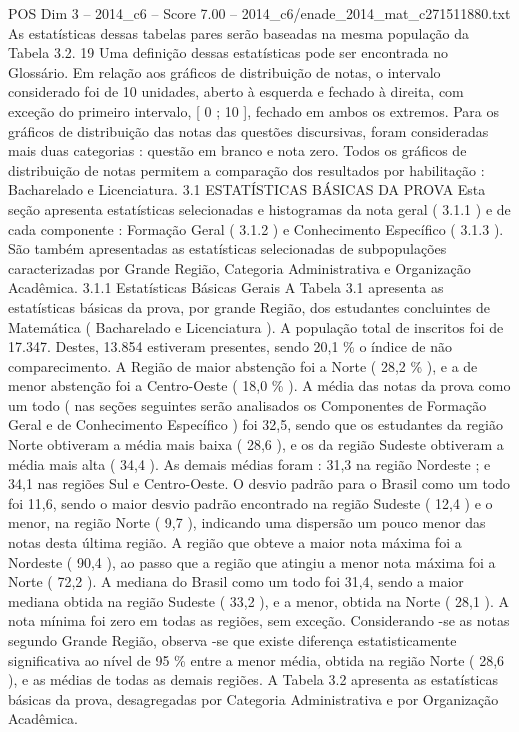 \begin{textsample}{POS Dim 3 – 2014\_c6 – Score 7.00 – 2014\_c6/enade\_2014\_mat\_c271511880.txt}
As estatísticas dessas tabelas pares serão baseadas na mesma população da Tabela 3.2. 19 Uma definição dessas estatísticas pode ser encontrada no Glossário.
Em relação aos gráficos de distribuição de notas, o intervalo considerado foi de 10 unidades, aberto à esquerda e fechado à direita, com exceção do primeiro intervalo, [ 0 ; 10 ], fechado em ambos os extremos.
Para os gráficos de distribuição das notas das questões discursivas, foram consideradas mais duas categorias : questão em branco e nota zero.
Todos os gráficos de distribuição de notas permitem a comparação dos resultados por habilitação : Bacharelado e Licenciatura. 3.1 ESTATÍSTICAS BÁSICAS DA PROVA Esta seção apresenta estatísticas selecionadas e histogramas da nota geral ( 3.1.1 ) e de cada componente : Formação Geral ( 3.1.2 ) e Conhecimento Específico ( 3.1.3 ).
São também apresentadas as estatísticas selecionadas de subpopulações caracterizadas por Grande Região, Categoria Administrativa e Organização Acadêmica. 3.1.1 Estatísticas Básicas Gerais A Tabela 3.1 apresenta as estatísticas básicas da prova, por grande Região, dos estudantes concluintes de Matemática ( Bacharelado e Licenciatura ).
A população total de inscritos foi de 17.347.
Destes, 13.854 estiveram presentes, sendo 20,1 \% o índice de não comparecimento.
A Região de maior abstenção foi a Norte ( 28,2 \% ), e a de menor abstenção foi a Centro-Oeste ( 18,0 \% ).
A média das notas da prova como um todo ( nas seções seguintes serão analisados os Componentes de Formação Geral e de Conhecimento Específico ) foi 32,5, sendo que os estudantes da região Norte obtiveram a média mais baixa ( 28,6 ), e os da região Sudeste obtiveram a média mais alta ( 34,4 ).
As demais médias foram : 31,3 na região Nordeste ; e 34,1 nas regiões Sul e Centro-Oeste.
O desvio padrão para o Brasil como um todo foi 11,6, sendo o maior desvio padrão encontrado na região Sudeste ( 12,4 ) e o menor, na região Norte ( 9,7 ), indicando uma dispersão um pouco menor das notas desta última região.
A região que obteve a maior nota máxima foi a Nordeste ( 90,4 ), ao passo que a região que atingiu a menor nota máxima foi a Norte ( 72,2 ).
A mediana do Brasil como um todo foi 31,4, sendo a maior mediana obtida na região Sudeste ( 33,2 ), e a menor, obtida na Norte ( 28,1 ).
A nota mínima foi zero em todas as regiões, sem exceção.
Considerando -se as notas segundo Grande Região, observa -se que existe diferença estatisticamente significativa ao nível de 95 \% entre a menor média, obtida na região Norte ( 28,6 ), e as médias de todas as demais regiões.
A Tabela 3.2 apresenta as estatísticas básicas da prova, desagregadas por Categoria Administrativa e por Organização Acadêmica.

\end{textsample}

